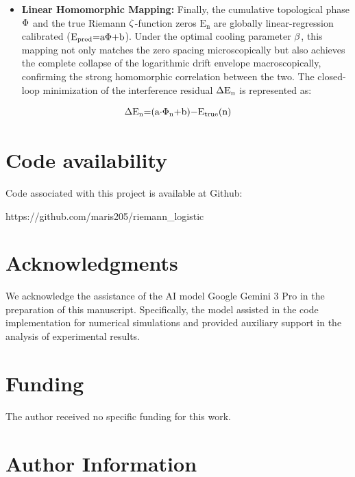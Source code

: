 \documentclass[fleqn,10pt]{wlscirep}
\begin{document}
\begin{itemize}
\item
  \textbf{Linear Homomorphic Mapping:} Finally, the cumulative
  topological phase \(\text{\ensuremath{\Phi}}\) and the true Riemann
  \(\text{\ensuremath{\zeta}}\)-function zeros \(\text{E}_{\text{n}}\) are globally
  linear-regression calibrated
  (\(\text{E}_{\text{pred}}\text{=}\text{a}\text{\ensuremath{\Phi}+}\text{b}\)). Under
  the optimal cooling parameter \(\text{\ensuremath{\beta}}\), this mapping not only
  matches the zero spacing microscopically but also achieves the
  complete collapse of the logarithmic drift envelope macroscopically,
  confirming the strong homomorphic correlation between the two. The
  closed-loop minimization of the interference residual
  \(\text{\ensuremath{\Delta}}\text{E}_{\text{n}}\) is represented as:
\end{itemize}

\[\text{\ensuremath{\Delta}}\text{E}_{\text{n}}\text{=(}\text{a}\text{\ensuremath{\cdot}}\text{\ensuremath{\Phi}}_{\text{n}}\text{+}\text{b}\text{)\ensuremath{-}}\text{E}_{\text{true}}\text{(}\text{n}\text{)}\]



\section*{Code availability}

Code associated with this project is available at Github:

{https://github.com/maris205/riemann\_logistic}


\section*{Acknowledgments}

We acknowledge the assistance of the AI model Google Gemini 3 Pro in the
preparation of this manuscript. Specifically, the model assisted in the
code implementation for numerical simulations and provided auxiliary
support in the analysis of experimental results.

\section*{Funding}

The author received no specific funding for this work.

\section*{Author Information}
\end{document}
